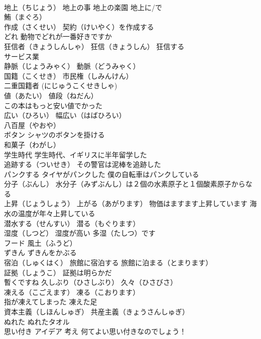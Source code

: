 \documentclass[8pt]{extreport}
\begin{document}
\begin{CJK}{UTF8}{min}
\\	地上（ちじょう） 地上の事 地上の楽園 地上に/で
\\	鮪（まぐろ）
\\	作成（さくせい） 契約（けいやく）を作成する
\\	どれ 動物でどれが一番好きですか
\\	狂信者（きょうしんしゃ） 狂信（きょうしん） 狂信する
\\	サービス業
\\	静脈（じょうみゃく） 動脈（どうみゃく）
\\	国籍（こくせき） 市民権（しみんけん）
\\	二重国籍者 (にじゅうこくせきしゃ)
\\	値（あたい） 値段（ねだん）
\\	この本はもっと安い値でかった
\\	広い（ひろい） 幅広い（はばひろい）
\\	八百屋（やおや）
\\	ボタン シャツのボタンを掛ける
\\	和菓子（わがし）
\\	学生時代 学生時代、イギリスに半年留学した
\\	追跡する（ついせき） その警官は泥棒を追跡した
\\	パンクする タイヤがパンクした 僕の自転車はパンクしている
\\	分子（ぶんし） 水分子（みずぶんし）は２個の水素原子と１個酸素原子からなる
\\	上昇（じょうしょう） 上がる（あがります） 物価はますます上昇しています 海水の温度が年々上昇している
\\	潜水する（せんすい） 潜る（もぐります）
\\	湿度（しつど） 湿度が高い 多湿（たしつ）です
\\	フード 風土（ふうど） 
\\	ずきん ずきんをかぶる
\\	宿泊（しゅくはく） 旅館に宿泊する 旅館に泊まる（とまります）
\\	証拠（しょうこ） 証拠は明らかだ
\\	暫くですね 久しぶり（ひさしぶり） 久々（ひさびさ）
\\	凍える（こごえます） 凍る（こおります）
\\	指が凍えてしまった 凍えた足
\\	資本主義（しほんしゅぎ） 共産主義（きょうさんしゅぎ）
\\	ぬれた ぬれたタオル
\\	思い付き アイデア 考え 何てよい思い付きなのでしょう！

\end{CJK}
\end{document}
